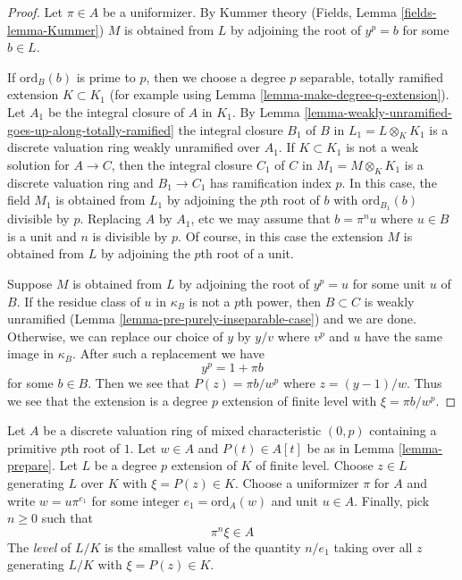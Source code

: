 \begin{proof}
Let $\pi \in A$ be a uniformizer. By Kummer theory
(Fields, Lemma \ref{fields-lemma-Kummer}) $M$ is obtained
from $L$ by adjoining the root of $y^p = b$ for some $b \in L$.

\medskip\noindent
If $\text{ord}_B(b)$ is prime to $p$, then we choose a degree $p$
separable, totally ramified extension $K \subset K_1$ (for example
using Lemma \ref{lemma-make-degree-q-extension}).
Let $A_1$ be the integral closure of $A$ in $K_1$.
By Lemma \ref{lemma-weakly-unramified-goes-up-along-totally-ramified}
the integral closure $B_1$ of $B$ in $L_1 = L \otimes_K K_1$
is a discrete valuation ring weakly unramified over $A_1$.
If $K \subset K_1$ is not a weak solution for $A \to C$, then
the integral closure $C_1$ of $C$ in $M_1 = M \otimes_K K_1$ is a
discrete valuation ring and $B_1 \to C_1$ has ramification index $p$.
In this case, the field $M_1$ is obtained from $L_1$ by adjoining the
$p$th root of $b$ with $\text{ord}_{B_1}(b)$ divisible by $p$.
Replacing $A$ by $A_1$, etc we may assume that $b = \pi^n u$ where
$u \in B$ is a unit and $n$ is divisible by $p$. Of course, in
this case the extension $M$ is obtained from $L$ by adjoining
the $p$th root of a unit.

\medskip\noindent
Suppose $M$ is obtained from $L$ by adjoining the root of
$y^p = u$ for some unit $u$ of $B$. If the residue class of $u$
in $\kappa_B$ is not a $p$th power, then $B \subset C$ is
weakly unramified (Lemma \ref{lemma-pre-purely-inseparable-case})
and we are done. Otherwise, we can replace our choice of $y$ by
$y/v$ where $v^p$ and $u$ have the same image in $\kappa_B$.
After such a replacement we have
$$
y^p = 1 + \pi b
$$
for some $b \in B$. Then we see that $P(z) = \pi b/ w^p$ where
$z = (y - 1)/w$. Thus we see that the extension is a degree $p$
extension of finite level with $\xi = \pi b / w^p$.
\end{proof}

\noindent
Let $A$ be a discrete valuation ring of mixed characteristic $(0, p)$
containing a primitive $p$th root of $1$. Let $w \in A$ and $P(t) \in A[t]$
be as in Lemma \ref{lemma-prepare}. Let $L$ be a degree $p$ extension of
$K$ of finite level. Choose $z \in L$ generating $L$ over $K$
with $\xi = P(z) \in K$. Choose a uniformizer $\pi$ for $A$ and write
$w = u \pi^{e_1}$ for some integer $e_1 = \text{ord}_A(w)$
and unit $u \in A$. Finally, pick $n \geq 0$ such that
$$
\pi^n \xi \in A
$$
The {\it level} of $L/K$ is the smallest value of the quantity $n/e_1$
taking over all $z$ generating $L/K$ with $\xi = P(z) \in K$.

